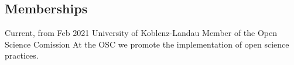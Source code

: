 \documentclass[10pt]{FreemanCV}
\begin{document}
\begin{paracol}{2}

\section{Memberships}

\jobentry
	{Current, from Feb 2021} 
	{}
	{University of Koblenz-Landau}
	{Member of the Open Science Comission}  
	{At the OSC we promote the implementation of open science practices.}








	
	
	

\end{paracol}
\end{document}
